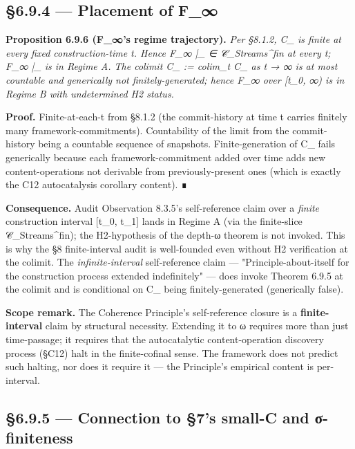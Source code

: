 \documentclass[11pt, openany]{book}
\begin{document}
\subsection{§6.9.4 --- Placement of F\_\allowbreak{}∞}

\textbf{Proposition 6.9.6 (F\_\allowbreak{}∞'s regime trajectory).} \textit{Per §8.1.2, C\_ is finite at every fixed construction-time t. Hence F\_\allowbreak{}∞ |\_ ∈ 𝒞\_\allowbreak{}Streams\textasciicircum{}{fin} at every t; F\_\allowbreak{}∞ |\_ is in Regime A. The colimit C\_ := colim\_\allowbreak{}t C\_ as t → ∞ is at most countable and generically not finitely-generated; hence F\_\allowbreak{}∞ over [t\_\allowbreak{}0, ∞) is in Regime B with undetermined H2 status.}

\textbf{Proof.} Finite-at-each-t from §8.1.2 (the commit-history at time t carries finitely many framework-commitments). Countability of the limit from the commit-history being a countable sequence of snapshots. Finite-generation of C\_ fails generically because each framework-commitment added over time adds new content-operations not derivable from previously-present ones (which is exactly the C12 autocatalysis corollary content). ∎

\textbf{Consequence.} Audit Observation 8.3.5's self-reference claim over a \textit{finite} construction interval [t\_\allowbreak{}0, t\_\allowbreak{}1] lands in Regime A (via the finite-slice 𝒞\_\allowbreak{}Streams\textasciicircum{}{fin}); the H2-hypothesis of the depth-ω theorem is not invoked. This is why the §8 finite-interval audit is well-founded even without H2 verification at the colimit. The \textit{infinite-interval} self-reference claim --- "Principle-about-itself for the construction process extended indefinitely" --- does invoke Theorem 6.9.5 at the colimit and is conditional on C\_ being finitely-generated (generically false).

\textbf{Scope remark.} The Coherence Principle's self-reference closure is a \textbf{finite-interval} claim by structural necessity. Extending it to ω requires more than just time-passage; it requires that the autocatalytic content-operation discovery process (§C12) halt in the finite-cofinal sense. The framework does not predict such halting, nor does it require it --- the Principle's empirical content is per-interval.

\subsection{§6.9.5 --- Connection to §7's small-C and σ-finiteness}
\end{document}
